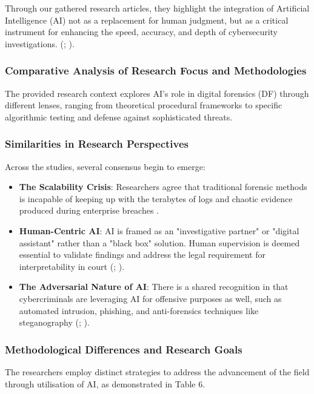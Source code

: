 \documentclass[12pt,a4paper]{article}
\begin{document}
Through our gathered research articles, they highlight the integration of Artificial Intelligence (AI) not as a replacement for human judgment, but as a critical instrument for enhancing the speed, accuracy, and depth of cybersecurity investigations. (\cite{sanna2025improving}; \cite{11385975}). 

\subsubsection{Comparative Analysis of Research Focus and Methodologies}
The provided research context explores AI's role in digital forensics (DF) through different lenses, ranging from theoretical procedural frameworks to specific algorithmic testing and defense against sophisticated threats.

\subsubsection{Similarities in Research Perspectives}
Across the studies, several consensus begin to emerge:
\begin{itemize}
\item \textbf{The Scalability Crisis}: Researchers agree that traditional forensic methods is incapable of keeping up with the terabytes of logs and chaotic evidence produced during enterprise breaches \cite{11385975}.
\item \textbf{Human-Centric AI}: AI is framed as an "investigative partner" or "digital assistant" rather than a "black box" solution. Human supervision is deemed essential to validate findings and address the legal requirement for interpretability in court (\cite{sanna2025improving}; \cite{11385975}).
\item \textbf{The Adversarial Nature of AI}: There is a shared recognition in that cybercriminals are leveraging AI for offensive purposes as well, such as automated intrusion, phishing, and anti-forensics techniques like steganography (\cite{11166697}; \cite{sanna2025improving}).
\end{itemize}

\subsubsection{Methodological Differences and Research Goals}
The researchers employ distinct strategies to address the advancement of the field through utilisation of AI, as demonstrated in Table 6.
\end{document}
